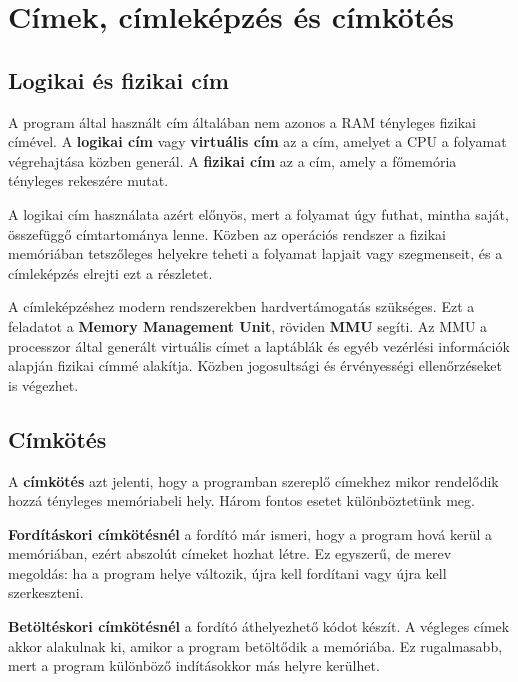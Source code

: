 \section{Címek, címleképzés és címkötés}

\subsection{Logikai és fizikai cím}

A program által használt cím általában nem azonos a RAM tényleges fizikai címével. A \textbf{logikai cím} vagy \textbf{virtuális cím} az a cím, amelyet a CPU a folyamat végrehajtása közben generál. A \textbf{fizikai cím} az a cím, amely a főmemória tényleges rekeszére mutat.

A logikai cím használata azért előnyös, mert a folyamat úgy futhat, mintha saját, összefüggő címtartománya lenne. Közben az operációs rendszer a fizikai memóriában tetszőleges helyekre teheti a folyamat lapjait vagy szegmenseit, és a címleképzés elrejti ezt a részletet.



A címleképzéshez modern rendszerekben hardvertámogatás szükséges. Ezt a feladatot a \textbf{Memory Management Unit}, röviden \textbf{MMU} segíti. Az MMU a processzor által generált virtuális címet a laptáblák és egyéb vezérlési információk alapján fizikai címmé alakítja. Közben jogosultsági és érvényességi ellenőrzéseket is végezhet.

\begin{center}

\end{center}

\subsection{Címkötés}

A \textbf{címkötés} azt jelenti, hogy a programban szereplő címekhez mikor rendelődik hozzá tényleges memóriabeli hely. Három fontos esetet különböztetünk meg.

\textbf{Fordításkori címkötésnél} a fordító már ismeri, hogy a program hová kerül a memóriában, ezért abszolút címeket hozhat létre. Ez egyszerű, de merev megoldás: ha a program helye változik, újra kell fordítani vagy újra kell szerkeszteni.

\textbf{Betöltéskori címkötésnél} a fordító áthelyezhető kódot készít. A végleges címek akkor alakulnak ki, amikor a program betöltődik a memóriába. Ez rugalmasabb, mert a program különböző indításokkor más helyre kerülhet.

